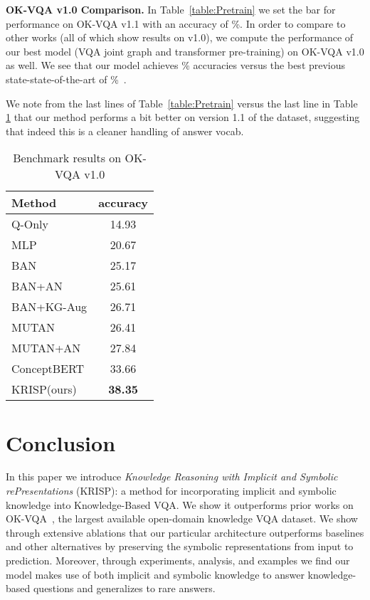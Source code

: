 \documentclass[final]{cvpr}
\providecommand{\ModelName}{KRISP\xspace}
\providecommand{\ModelNameLong}{Knowledge Reasoning with Implicit and  Symbolic rePresentations\xspace}
\providecommand{\myparagraph}[1]{\noindent\textbf{#1.}}
\providecommand{\sectionvspace}{\vspace{-0cm}}
\begin{document}
\myparagraph{OK-VQA v1.0 Comparison}
In Table~\ref{table:Pretrain} we set the bar for performance on OK-VQA v1.1 with an accuracy of \%. In order to compare to other works (all of which show results on v1.0), we compute the performance of our best model (VQA joint graph and transformer pre-training) on OK-VQA v1.0 as well. We see that our model achieves \% accuracies versus the best previous state-state-of-the-art of \%~\cite{garderes2020conceptbert}.

We note from the last lines of Table~\ref{table:Pretrain} versus the last line in Table \ref{table:OKVQA} that our method performs a bit better on version 1.1 of the dataset, suggesting that indeed this is a cleaner handling of answer vocab.


\begin{table}[t]
\begin{center}
\begin{tabular}{@{}lc@{}}
\toprule
Method & accuracy\\ \midrule
Q-Only & 14.93 \\
MLP & 20.67  \\
BAN \cite{kim2018bilinear} & 25.17 \\
BAN+AN \cite{marino19cvpr} & 25.61 \\
BAN+KG-Aug \cite{guohao20mm} & 26.71 \\
MUTAN \cite{ben2017mutan} & 26.41 \\
MUTAN+AN \cite{marino19cvpr} & 27.84  \\
ConceptBERT \cite{garderes2020conceptbert} & 33.66 \\
\ModelName (ours) & \textbf{38.35} \\
\bottomrule
\end{tabular}
\end{center}
\caption{Benchmark results on OK-VQA v1.0}
\label{table:OKVQA}
\vspace{-.3cm}
\end{table}

\sectionvspace
\section{Conclusion}
\sectionvspace
In this paper we introduce \emph{\ModelNameLong} (\ModelName): a method for incorporating implicit and symbolic knowledge into Knowledge-Based VQA. We show it outperforms prior works on OK-VQA~\cite{marino19cvpr}, the largest available open-domain knowledge VQA dataset. We show through extensive ablations that our particular architecture outperforms baselines and other alternatives by preserving the symbolic representations from input to prediction. Moreover, through experiments, analysis, and examples we find our model makes use of both implicit and symbolic knowledge to answer knowledge-based questions and generalizes to rare answers.
\end{document}
